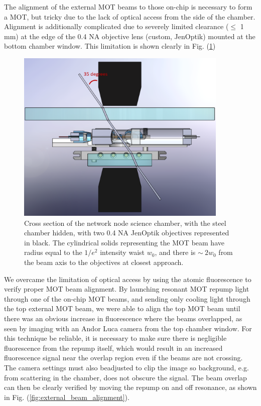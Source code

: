 The alignment of the external MOT beams to those on-chip is necessary to form a MOT,
but tricky due to the lack of optical access from the side of the chamber. Alignment is additionally complicated due to severely limited clearance ($\leq$ 1 mm) at the edge of the 0.4 NA objective lens (custom, JenOptik) mounted at the bottom chamber window. This limitation is shown clearly in Fig. (\ref{fig:chamber_cross_section})
\begin{figure}[!ht]
    \centering
    \includegraphics[width=0.9\textwidth]{Images/chamber_cross_section.pdf}
    \caption{Cross section of the network node science chamber, with the steel chamber hidden, with two 0.4 NA JenOptik objectives represented in black. The cylindrical solids representing the MOT beam have radius equal to the $1/e^2$ intensity waist $w_0$, and there is $\sim~2w_0$ from the beam axis to the objectives at closest approach.}
    \label{fig:chamber_cross_section}
\end{figure}
We overcame the limitation of optical access by using the atomic fluorescence to verify proper MOT beam alignment. By launching resonant MOT repump light through one of the on-chip MOT beams, and sending only cooling light through the top external MOT beam, we were able to align the top MOT beam until there was an obvious increase in fluorescence where the beams overlapped, as seen by imaging with an Andor Luca camera from the top chamber window. For this technique be reliable, it is necessary to make sure there is negligible fluorescence from the repump itself, which would result in an increased fluorescence signal near the overlap region even if the beams are not crossing. The camera settings must also beadjusted to clip the image so background, e.g. from scattering in the chamber, does not obscure the signal. The beam overlap can then be clearly verified by moving the repump on and off resonance, as shown in Fig. (\ref{fig:external_beam_alignment}).
